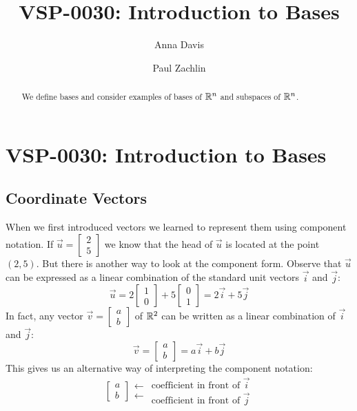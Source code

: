 \documentclass{ximera}
\author{Anna Davis \and Paul Zachlin} \title{VSP-0030:  Introduction to Bases} \license{CC-BY 4.0}
\begin{document}
\begin{abstract}
We define bases and consider examples of bases of $\mathbb{R}^n$ and subspaces of $\mathbb{R}^n$.
\end{abstract}
\maketitle

\section*{VSP-0030:  Introduction to Bases}
\subsection*{Coordinate Vectors}
When we first introduced vectors we learned to represent them using component notation.  If $\vec{u}=\begin{bmatrix}2\\5\end{bmatrix}$ we know that the head of $\vec{u}$ is located at the point $(2, 5)$.  But there is another way to look at the component form.  Observe that $\vec{u}$ can be expressed as a linear combination of the standard unit vectors $\vec{i}$ and $\vec{j}$:
$$\vec{u}=2\begin{bmatrix}1\\0\end{bmatrix}+5\begin{bmatrix}0\\1\end{bmatrix}=2\vec{i}+5\vec{j}$$
In fact, any vector $\vec{v}=\begin{bmatrix}a\\b\end{bmatrix}$ of $\RR^2$ can be written as a linear combination of $\vec{i}$ and $\vec{j}$:
$$\vec{v}=\begin{bmatrix}a\\b\end{bmatrix}=a\vec{i}+b\vec{j}$$
This gives us an alternative way of interpreting the component notation:
$$\left[\begin{array}{c}  
 a\\b
 \end{array}\right]
 \begin{array}{c}
 
 \longleftarrow\\
 \longleftarrow

 \end{array}
\begin{array}{c}  
 \mbox{coefficient in front of $\vec{i}$}\\\mbox{coefficient in front of $\vec{j}$}
 \end{array}$$
 
\end{document}

